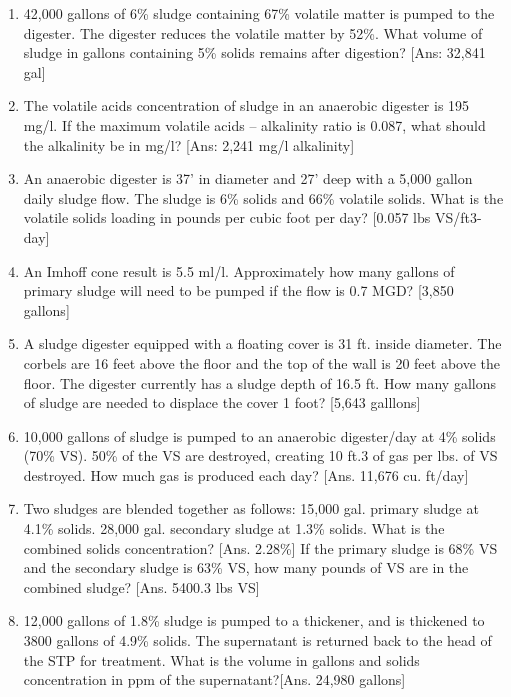 \documentclass{article}
\begin{document}
\begin{enumerate}
\item 42,000 gallons of 6\% sludge containing 67\% volatile matter is pumped to the digester.  The digester reduces the volatile matter by 52\%.  What volume of sludge in gallons containing 5\% solids remains after digestion? [Ans:  32,841 gal]


\item The volatile acids concentration of sludge in an anaerobic digester is 195 mg/l.  If the maximum volatile acids – alkalinity ratio is 0.087, what should the alkalinity be in mg/l? [Ans: 2,241 mg/l alkalinity]


\item An anaerobic digester is 37’ in diameter and 27’ deep with a 5,000 gallon daily sludge flow. The sludge is 6\% solids and 66\% volatile solids.  What is the volatile solids loading in pounds per cubic foot per day? [0.057 lbs VS/ft3-day]

\item An Imhoff cone result is 5.5 ml/l.  Approximately how many gallons of primary sludge will need to be pumped if the flow is 0.7 MGD? [3,850 gallons]

\item A sludge digester equipped with a floating cover is 31 ft. inside diameter.  The corbels are 16 feet above the floor and the top of the wall is 20 feet above the floor.  The digester currently has a sludge depth of 16.5 ft. How many gallons of sludge are needed to displace the cover 1 foot? [5,643 galllons]

\item 10,000 gallons of sludge is pumped to an anaerobic digester/day at 4\% solids (70\% VS).  50\% of the VS are destroyed, creating 10 ft.3 of gas per lbs. of VS destroyed. How much gas is produced each day? [Ans. 11,676 cu. ft/day]

\item Two sludges are blended together as follows: 15,000 gal. primary sludge at 4.1\% solids. 28,000 gal. secondary sludge at 1.3\% solids. 
What is the combined solids concentration? [Ans. 2.28\%]
If the primary sludge is 68\% VS and the secondary sludge is 63\% VS, how many pounds of VS are in the combined sludge? [Ans. 5400.3 lbs VS]


\item 12,000 gallons of 1.8\% sludge is pumped to a thickener, and is thickened to 3800 gallons of 4.9\% solids. The supernatant is returned back to the head of the STP for treatment.  What is the volume in gallons and solids concentration in ppm of the supernatant?[Ans. 24,980 gallons]



\end{enumerate}
\end{document}
